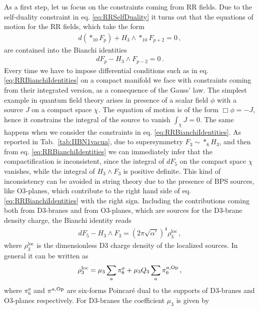 \documentclass[12pt,a4paper]{book}
\begin{document}
As a first step, let us focus on the constraints coming from RR fields. Due to the self-duality constraint in eq. \eqref{eq:RRSelfDuality} it turns out that the equations of motion for the RR fields, which take the form
\begin{align}
 \label{eq:RREquationsOfMotion}
 d\left(*_{10} F_p\right) + H_3 \wedge *_{10} F_{p + 2} = 0\,,
 \end{align}
are contained into the Bianchi identities
\begin{align}
\label{eq:RRBianchiIdentities}
dF_p - H_3 \wedge F_{p-2} = 0\,.
\end{align}
Every time we have to impose differential conditions such as in eq. \eqref{eq:RRBianchiIdentities} on a compact manifold we face with constraints coming from their integrated version, as a consequence of the Gauss' law. The simplest example in quantum field theory arises in presence of a scalar field $\phi$ with a source $J$ on a compact space $\chi$. The equation of motion is of the form $\Box \phi = - J$, hence it constrains the integral of the source to vanish $\int_\chi J = 0$. The same happens when we consider the constraints in eq. \eqref{eq:RRBianchiIdentities}. As reported in Tab.~\ref{tab:IIBN1vacua}, due to supersymmetry $F_3 \sim *_{6} H_3$, and then from eq. \eqref{eq:RRBianchiIdentities} we can immediately infer that the compactification is inconsistent, since the integral of $dF_5$ on the compact space $\chi$ vanishes, while the integral of $H_3 \wedge F_3$ is positive definite. This kind of inconsistency can be avoided in string theory due to the presence of BPS sources, like O3-planes, which contribute to the right hand side of eq. \eqref{eq:RRBianchiIdentities} with the right sign. Including the contributions coming both from D3-branes and from O3-planes, which are sources for the D3-brane density charge, the Bianchi identity reads
\begin{align}
\label{eq:TadpoleF3}
dF_5 - H_3 \wedge F_3 = \left(2 \pi \sqrt{\alpha'}\right)^4 \rho^{\text{loc}}_3\,,
\end{align}
where $\rho^{\text{loc}}_3$ is the dimensionless D3 charge density of the localized sources. In general it can be written as
\begin{align}
\label{eq:D3ChargeDensity}
\rho^{\rm loc}_3 = \mu_3 \sum_a \pi^a_6 + \mu_3 Q_3 \sum_a \pi^{a, \rm Op}_6 \,,
\end{align}
where $\pi^a_6$ and $\pi^{a, \rm Op}$ are six-forms Poincar\'e dual to the supports of D3-branes and O3-planes respectively. For D3-branes the coefficient $\mu_3$ is given by
\end{document}
